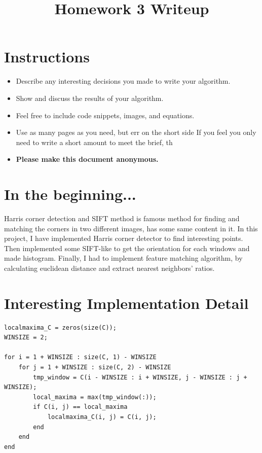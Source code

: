 \title{\vspace{-1cm}Homework 3 Writeup}



\maketitle
\vspace{-3cm}
\thispagestyle{fancy}

\section*{Instructions}
\begin{itemize}
  \item Describe any interesting decisions you made to write your algorithm.
  \item Show and discuss the results of your algorithm.
  \item Feel free to include code snippets, images, and equations.
  \item Use as many pages as you need, but err on the short side If you feel you only need to write a short amount to meet the brief, th
  
  \item \textbf{Please make this document anonymous.}
\end{itemize}

\section*{In the beginning...}

Harris corner detection and SIFT method is famous method for finding and matching the corners in two different images, has some same content in it.
In this project, I have implemented Harris corner detector to find interesting points. Then implemented some SIFT-like to get the orientation for each windows and made histogram.
Finally, I had to implement feature matching algorithm, by calculating euclidean distance and extract nearest neighbors' ratios.

\section*{Interesting Implementation Detail}

\begin{lstlisting}[style=Matlab-editor]
localmaxima_C = zeros(size(C));
WINSIZE = 2;

for i = 1 + WINSIZE : size(C, 1) - WINSIZE
    for j = 1 + WINSIZE : size(C, 2) - WINSIZE
        tmp_window = C(i - WINSIZE : i + WINSIZE, j - WINSIZE : j + WINSIZE);
        local_maxima = max(tmp_window(:));
        if C(i, j) == local_maxima
            localmaxima_C(i, j) = C(i, j);
        end
    end
end
\end{lstlisting}

